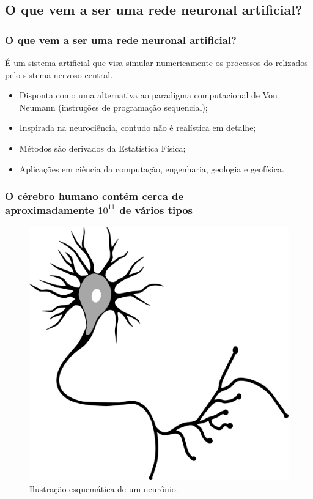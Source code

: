 \documentclass[10pt]{beamer} %
\begin{document}
\subsection{O que vem a ser uma rede neuronal artificial?}
\begin{frame}
	\frametitle{O que vem a ser uma rede neuronal artificial?}
				\color{blue} É um sistema artificial que visa simular numericamente os processos do relizados pelo sistema nervoso central. 
				
				\begin{itemize}
					\item Disponta como uma alternativa ao paradigma computacional de Von Neumann (instruções de programação sequencial);
					\pause
					\item Inspirada na neurociência, contudo não é realística em detalhe;
					\pause
					\item Métodos são derivados da Estatística Física;
					\pause
					\item Aplicações em ciência da computação, engenharia, geologia e geofísica. 
				\end{itemize}
\end{frame}

\begin{frame}
	\frametitle{O cérebro humano contém cerca de \\ aproximadamente $10^{11}$   de vários tipos}
	\begin{figure}
		\centering
		\includegraphics[scale=0.2]{Imagens/neuronio.png} 
		\caption{Ilustração esquemática de um neurônio.}
	\end{figure}
\end{frame}
\end{document}
